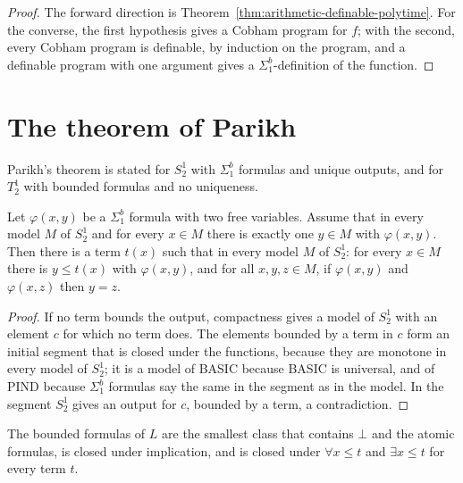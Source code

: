 \begin{proof}
  \leanok
  The forward direction is Theorem~\ref{thm:arithmetic-definable-polytime}. For the converse, the
  first hypothesis gives a Cobham program for $f$; with the second, every Cobham program is
  definable, by induction on the program, and a definable program with one argument gives a
  $\Sigma^b_1$-definition of the function.
\end{proof}

\section{The theorem of Parikh}
\label{sec:arithmetic-parikh}

Parikh's theorem is stated for $S^1_2$ with $\Sigma^b_1$ formulas and unique outputs, and for $T^1_2$
with bounded formulas and no uniqueness.

\begin{theorem}
  \label{thm:arithmetic-parikh}
  \leanok
  Let $\varphi(x, y)$ be a $\Sigma^b_1$ formula with two free variables. Assume that in every model
  $M$ of $S^1_2$ and for every $x \in M$ there is exactly one $y \in M$ with $\varphi(x, y)$. Then
  there is a term $t(x)$ such that in every model $M$ of $S^1_2$: for every $x \in M$ there is $y \le
  t(x)$ with $\varphi(x, y)$, and for all $x, y, z \in M$, if $\varphi(x, y)$ and $\varphi(x, z)$ then
  $y = z$.
\end{theorem}

\begin{proof}
  \leanok
  If no term bounds the output, compactness gives a model of $S^1_2$ with an element $c$ for which no
  term does. The elements bounded by a term in $c$ form an initial segment that is closed under the
  functions, because they are monotone in every model of $S^1_2$; it is a model of BASIC because BASIC
  is universal, and of PIND because $\Sigma^b_1$ formulas say the same in the segment as in the
  model. In the segment $S^1_2$ gives an output for $c$, bounded by a term, a contradiction.
\end{proof}

\begin{definition}
  \label{def:arithmetic-bounded}
  \leanok
  \own{}
  \infrastructure{}
  The bounded formulas of $L$ are the smallest class that contains $\bot$ and the atomic formulas, is
  closed under implication, and is closed under $\forall x \le t$ and $\exists x \le t$ for every
  term $t$.
\end{definition}

